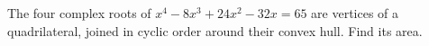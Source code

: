 The four complex roots of $x^4-8x^3+24x^2-32x=65$ are vertices of a quadrilateral, joined in cyclic order around their convex hull. Find its area.
